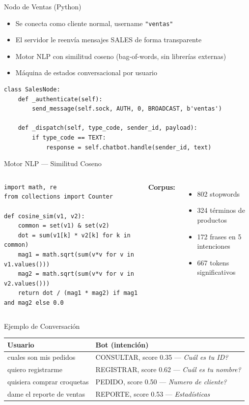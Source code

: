 \documentclass[aspectratio=169,14pt]{beamer}
\begin{document}
\begin{frame}[fragile]{Nodo de Ventas (Python)}
\begin{itemize}
  \item Se conecta como cliente normal, username \texttt{"ventas"}
  \item El servidor le reenvía mensajes SALES de forma transparente
  \item Motor NLP con similitud coseno (bag-of-words, sin librerías externas)
  \item Máquina de estados conversacional por usuario
\end{itemize}

\begin{lstlisting}[style=python]
class SalesNode:
    def _authenticate(self):
        send_message(self.sock, AUTH, 0, BROADCAST, b'ventas')

    def _dispatch(self, type_code, sender_id, payload):
        if type_code == TEXT:
            response = self.chatbot.handle(sender_id, text)
\end{lstlisting}
\end{frame}

\begin{frame}[fragile]{Motor NLP --- Similitud Coseno}
\begin{columns}[T]
\begin{lstlisting}[style=python]
import math, re
from collections import Counter

def cosine_sim(v1, v2):
    common = set(v1) & set(v2)
    dot = sum(v1[k] * v2[k] for k in common)
    mag1 = math.sqrt(sum(v*v for v in v1.values()))
    mag2 = math.sqrt(sum(v*v for v in v2.values()))
    return dot / (mag1 * mag2) if mag1 and mag2 else 0.0
\end{lstlisting}
\small
\textbf{Corpus:}
\begin{itemize}
  \item 802 stopwords
  \item 324 términos de productos
  \item 172 frases en 5 intenciones
  \item 667 tokens significativos
\end{itemize}
\end{columns}
\end{frame}

\begin{frame}{Ejemplo de Conversación}
\centering
\small
\begin{tabular}{p{4.5cm} p{6.4cm}}
\toprule
\textbf{Usuario} & \textbf{Bot (intención)} \\
\midrule
cuales son mis pedidos &
  CONSULTAR, score 0.35 --- \textit{Cuál es tu ID?} \\[4pt]
quiero registrarme &
  REGISTRAR, score 0.62 --- \textit{Cuál es tu nombre?} \\[4pt]
quisiera comprar croquetas &
  PEDIDO, score 0.50 --- \textit{Numero de cliente?} \\[4pt]
dame el reporte de ventas &
  REPORTE, score 0.53 --- \textit{Estadísticas} \\
\bottomrule
\end{tabular}
\end{frame}
\end{document}
